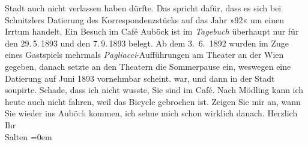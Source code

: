 \begin{ledgroupsized}[t]{13cm}
{{{                  Stadt auch nicht verlassen haben dürfte. Das spricht dafür, dass es sich bei Schnitzlers Datierung des Korrespondenzstücks
                  auf das Jahr »92« um einen Irrtum handelt. Ein Besuch
                  im Café Auböck ist im \emph{Tagebuch} überhaupt nur für den 29. 5. 1893 und den
                     7. 9. 1893
                  belegt. Ab dem 3. 6. 1892 wurden im Zuge eines Gastspiels
                  mehrmals \emph{Pagliacci}-Aufführungen am Theater an der Wien gegeben, danach setzte an den
                  Theatern die Sommerpause ein, weswegen eine Datierung auf Juni 1893
                  vornehmbar scheint.}}}\label{K_L03120-1h} war, und dann in der Stadt soupirte. Schade, dass ich
               nicht wusste, Sie sind im Café. Nach Mödling kann
               ich heute auch nicht {\pb}fahren, weil
               das Bicycle gebrochen ist. Zeigen Sie mir an, wann Sie wieder ins Aubö\textcolor{gray}{ck} kommen, ich sehne mich schon wirklich danach.\pend
           \pstart
           Herzlich {\\[\baselineskip]}Ihr {\\[\baselineskip]}\spacefill\mbox{Salten}\pend
           \leftskip=0em{}
         
         \endnumbering{}\end{ledgroupsized}\begin{anhang}\end{anhang}\newcommand{\dateiname}{L03120}\newcommand{\titel}{Felix Salten an Arthur Schnitzler, [Juni 1893?]}\newcommand{\editorInnen}{Martin Anton Müller und Laura Untner}
      
